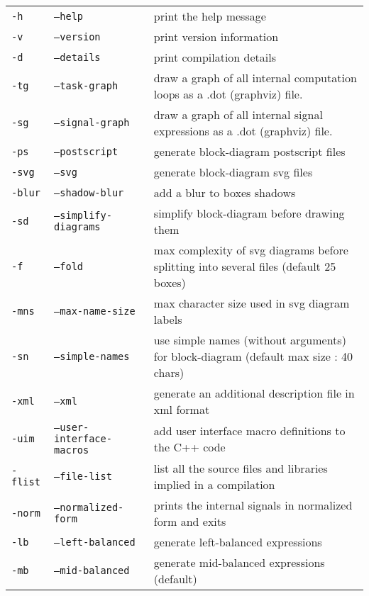 \begin{supertabular}{|p{1.5cm}|p{4cm}|p{5cm}|}  
\texttt{-h} 				& \texttt{--help} 					& print the help message  \\
\texttt{-v} 				& \texttt{--version} 				& print version information  \\
\texttt{-d} 				& \texttt{--details} 				& print compilation details  \\
\texttt{-tg} 				& \texttt{--task-graph} 			& draw a graph of all internal computation loops as a .dot (graphviz) file. \\
\texttt{-sg} 				& \texttt{--signal-graph} 			& draw a graph of all internal signal expressions as a .dot (graphviz) file.  \\

\texttt{-ps} 				& \texttt{--postscript} 			& generate block-diagram postscript files  \\
\texttt{-svg} 				& \texttt{--svg} 					& generate block-diagram svg files  \\
\texttt{-blur} 				& \texttt{--shadow-blur} 			& add a blur to boxes shadows  \\
\texttt{-sd} 				& \texttt{--simplify-diagrams} 		& simplify block-diagram before drawing them  \\
\texttt{-f } 		& \texttt{--fold }  		& max complexity of svg diagrams before splitting into several files (default 25 boxes)  \\
\texttt{-mns } 		& \texttt{--max-name-size } & max character size used in svg diagram labels\\
\texttt{-sn}             	& \texttt{--simple-names}			& use simple names (without arguments) for block-diagram (default max size : 40 chars) \\
\texttt{-xml} 				& \texttt{--xml} 					& generate an additional description file in xml format  \\
\texttt{-uim} 				& \texttt{--user-interface-macros} 	& add user interface macro definitions to the C++ code  \\
\texttt{-flist} 			& \texttt{--file-list} 				& list all the source files and libraries implied in a compilation  \\
\texttt{-norm} 				& \texttt{--normalized-form} 		& prints the internal signals in normalized form and exits  \\
\hline
\texttt{-lb}	 			& \texttt{--left-balanced} 			& generate left-balanced expressions  \\
\texttt{-mb} 				& \texttt{--mid-balanced} 			& generate mid-balanced expressions (default)  \\

\end{supertabular}
